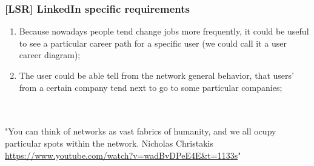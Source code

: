 \subsubsection*{\textbf{[LSR] LinkedIn specific requirements}}
\begin{enumerate}
    \item Because nowadays people tend change jobs more frequently, it could be useful to see a particular career path for a specific
    user (we could call it a user career diagram);
    \item The user could be able tell from the network general behavior, that users' from a certain company tend next to go to some particular companies;

\end{enumerate}

\\
\\
"You can think of networks as vast fabrics of humanity, and we all ocupy particular spots within the network. Nicholas Christakis \url{https://www.youtube.com/watch?v=wadBvDPeE4E&t=1133s}"
